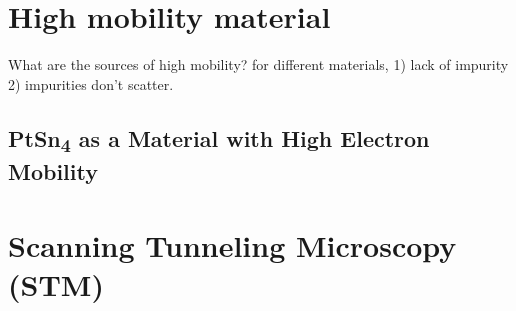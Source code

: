 \chapter{High mobility material}
What are the sources of high mobility? for different materials, 1) lack of impurity 2) impurities don't scatter. 

\section{PtSn\textsubscript{4} as a Material with High Electron Mobility}

\chapter{Scanning Tunneling Microscopy (STM)}
	











